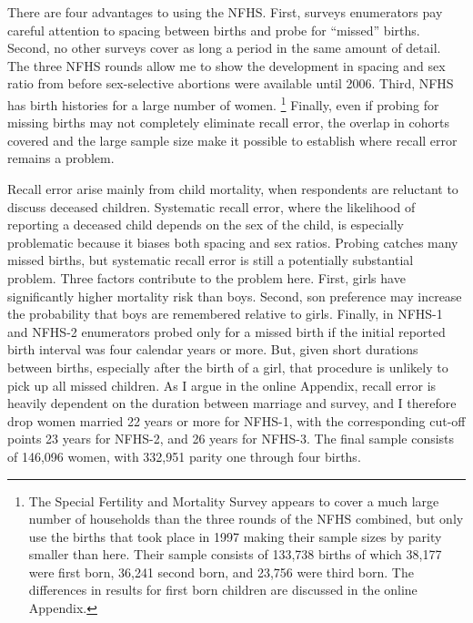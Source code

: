 \documentclass[12pt,letterpaper]{article}
\begin{document}
There are four advantages to using the NFHS.
First, surveys enumerators pay careful attention to spacing between births and
probe for ``missed'' births.
Second, no other surveys cover as long a period in the same amount of detail.
The three NFHS rounds allow me to show the development in spacing and 
sex ratio from before sex-selective abortions were available until 2006.
Third, NFHS has birth histories for a large number of women.%
\footnote{
The Special Fertility and Mortality Survey appears to cover a much large number of households
than the three rounds of the NFHS combined, but \citet{jha06} only use the births that 
took place in 1997 making their sample sizes by parity smaller than here.
Their sample consists of 133,738 births of which 38,177 were first
born, 36,241 second born, and 23,756 were third born.
The differences in results for first born children are discussed in the online 
Appendix.
}
Finally, even if probing for missing births may not completely eliminate recall error,   
the overlap in cohorts covered and the large sample size make it possible to establish 
where recall error remains a problem.

Recall error arise mainly from child mortality, when respondents are reluctant to
discuss deceased children.
Systematic recall error, where the likelihood of reporting a deceased child depends on
the sex of the child, is especially problematic because it biases both spacing
and sex ratios.
Probing catches many missed births, but systematic recall error is still a potentially 
substantial problem.
Three factors contribute to the problem here.
First, girls have significantly higher mortality risk than boys.
Second, son preference may increase the probability that boys are remembered relative to girls.
Finally, in NFHS-1 and NFHS-2 enumerators probed only for a missed birth if the
initial reported birth interval was four calendar years or more.
But, given short durations between births, especially after the birth of a girl,
that procedure is unlikely to pick up all missed children.
As I argue in the online Appendix, recall error is heavily dependent on the duration
between marriage and survey, and I therefore drop women married 22 years or more 
for NFHS-1, with the corresponding cut-off points 23 years for NFHS-2, 
and 26 years for NFHS-3.
The final sample consists of 146,096 women, with 332,951 parity one through four births.


\end{document}
